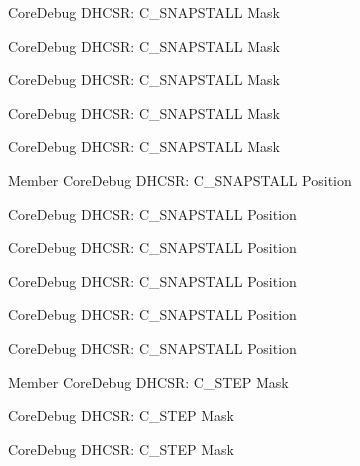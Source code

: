 \begin{DoxyRefList}
\label{deprecated__deprecated000483}%
%
Core\+Debug DHCSR\+: C\+\_\+\+SNAPSTALL Mask 

\label{deprecated__deprecated000585}%
%
Core\+Debug DHCSR\+: C\+\_\+\+SNAPSTALL Mask 

\label{deprecated__deprecated000318}%
%
Core\+Debug DHCSR\+: C\+\_\+\+SNAPSTALL Mask 

\label{deprecated__deprecated000032}%
%
Core\+Debug DHCSR\+: C\+\_\+\+SNAPSTALL Mask 

\label{deprecated__deprecated000394}%
%
Core\+Debug DHCSR\+: C\+\_\+\+SNAPSTALL Mask  
\item[Member \doxylink{group__CMSIS__CoreDebug_ga85747214e2656df6b05ec72e4d22bd6d}{Core\+Debug\+\_\+\+DHCSR\+\_\+\+C\+\_\+\+SNAPSTALL\+\_\+\+Pos} ]\label{deprecated__deprecated000317}%
%
Core\+Debug DHCSR\+: C\+\_\+\+SNAPSTALL Position 

\label{deprecated__deprecated000031}%
%
Core\+Debug DHCSR\+: C\+\_\+\+SNAPSTALL Position 

\label{deprecated__deprecated000584}%
%
Core\+Debug DHCSR\+: C\+\_\+\+SNAPSTALL Position 

\label{deprecated__deprecated000175}%
%
Core\+Debug DHCSR\+: C\+\_\+\+SNAPSTALL Position 

\label{deprecated__deprecated000482}%
%
Core\+Debug DHCSR\+: C\+\_\+\+SNAPSTALL Position 

\label{deprecated__deprecated000393}%
%
Core\+Debug DHCSR\+: C\+\_\+\+SNAPSTALL Position  
\item[Member \doxylink{group__CMSIS__CoreDebug_gae6bda72fbd32cc5734ff3542170dc00d}{Core\+Debug\+\_\+\+DHCSR\+\_\+\+C\+\_\+\+STEP\+\_\+\+Msk} ]\label{deprecated__deprecated000589}%
%
Core\+Debug DHCSR\+: C\+\_\+\+STEP Mask 

\label{deprecated__deprecated000124}%
%
Core\+Debug DHCSR\+: C\+\_\+\+STEP Mask 

\label{deprecated__deprecated000263}%
%
Core\+Debug DHCSR\+: C\+\_\+\+STEP Mask 


\end{DoxyRefList}
